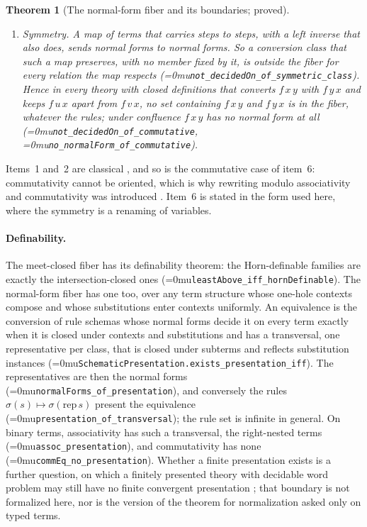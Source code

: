 \documentclass[11pt]{article}
\newcommand{\leanname}[1]{\textup{\Urlmuskip=0mu\relax\nolinkurl{#1}}}
\newtheorem{theorem}{Theorem}
\theoremstyle{definition}
\theoremstyle{remark}
\begin{document}
\begin{theorem}[The normal-form fiber and its boundaries; proved]
\begin{enumerate}[leftmargin=*]
  variables, as proof irrelevance does, or a variable with its
  $\eta$-expansion, is outside the fiber on every set containing them
  (\leanname{not_decidedOn_of_conv_vars}, \leanname{not_decidedOn_of_conv_eta}).
\item \emph{Symmetry.} A map of terms that carries steps to steps, with a left
  inverse that also does, sends normal forms to normal forms. So a conversion
  class that such a map preserves, with no member fixed by it, is outside the
  fiber for every relation the map respects
  (\leanname{not_decidedOn_of_symmetric_class}). Hence in every theory with
  closed definitions that converts $f\,x\,y$ with $f\,y\,x$ and keeps $f\,u\,x$
  apart from $f\,v\,x$, no set containing $f\,x\,y$ and $f\,y\,x$ is in the
  fiber, whatever the rules; under confluence $f\,x\,y$ has no normal form at
  all (\leanname{not_decidedOn_of_commutative},
  \leanname{no_normalForm_of_commutative}).
\end{enumerate}
\end{theorem}

Items~1 and~2 are classical \cite{NewmanCombinatorial,HuetConfluentReductions,KlopCRS},
and so is the commutative case of item~6: commutativity cannot be oriented,
which is why rewriting modulo associativity and commutativity was introduced
\cite{PetersonStickelAC,JouannaudKirchnerModulo}. Item~6 is stated in the form
used here, where the symmetry is a renaming of variables.

\paragraph{Definability.}
The meet-closed fiber has its definability theorem: the Horn-definable families
are exactly the intersection-closed ones (\leanname{leastAbove_iff_hornDefinable}).
The normal-form fiber has one too, over any term structure whose one-hole
contexts compose and whose substitutions enter contexts uniformly. An
equivalence is the conversion of rule schemas whose normal forms decide it on
every term exactly when it is closed under contexts and substitutions and has
a transversal, one representative per class, that is closed under subterms and
reflects substitution instances (\leanname{SchematicPresentation.exists_presentation_iff}).
The representatives are then the normal forms
(\leanname{normalForms_of_presentation}), and conversely the rules
$\sigma(s) \mapsto \sigma(\mathrm{rep}\,s)$ present the equivalence
(\leanname{presentation_of_transversal}); the rule set is infinite in general.
On binary terms, associativity has such a transversal, the right-nested terms
(\leanname{assoc_presentation}), and commutativity has none
(\leanname{commEq_no_presentation}). Whether a finite presentation exists is a
further question, on which a finitely presented theory with decidable word
problem may still have no finite convergent presentation
\cite{SquierFiniteDerivationType}; that boundary is not formalized here, nor is
the version of the theorem for normalization asked only on typed terms.
\end{document}
